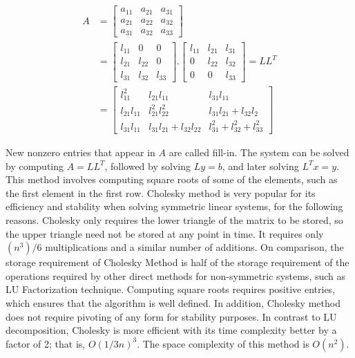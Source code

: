 \begin {align*}
 A &= 
    \begin{bmatrix}
     a_{11}       & a_{21} & a_{31} \\
     a_{21}       & a_{22} & a_{32} \\
     a_{31}       & a_{32} & a_{33} 
    \end{bmatrix} \\
&= 
    \begin{bmatrix}
     l_{11}       & 0 & 0 \\
     l_{21}       & l_{22} & 0 \\
     l_{31}       & l_{32} & l_{33} 
    \end{bmatrix}
       . 
    \begin{bmatrix}
     l_{11}       & l_{21} & l_{31} \\
     0            & l_{22} & l_{32} \\
     0            & 0      & l_{33} 
    \end{bmatrix}    
    = LL^T \\
&= 
    \begin{bmatrix}
     l_{11}^2           & l_{21} l_{11}      & l_{31}l_{11} \\
     l_{21} l_{11}      & l_{21}^2 l_{22}^2  & l_{31}l_{21} + l_{32}l_{2} \\
     l_{31} l_{11}      & l_{31}l_{21} + l_{32}l_{22}      & l_{31}^2 +  l_{32}^2 + l_{33}^2
    \end{bmatrix}
\end {align*}

New nonzero entries that appear in $A$ are called fill-in. The system can be solved by computing $A = LL^T$, followed by solving $Ly=b$, and later solving $L^Tx = y$. This method involves computing square roots of some of the elements, such as the first element in the first row. Cholesky method is very popular for its efficiency and stability when solving symmetric linear systems, for the following reasons. Cholesky only requires the lower triangle of the matrix to be stored, so the upper triangle need not be stored at any point in time. It 
requires only $(n^3)/6$ multiplications and a similar number of additions. On comparison, the storage requirement of Cholesky Method is half of the storage requirement of the operations required by other direct methods for non-symmetric systems, such as LU Factorization technique. Computing square roots requires positive entries, which ensures that the algorithm is well defined. In addition, Cholesky method does not require pivoting of any form for stability purposes. In contrast to LU decomposition, Cholesky is more efficient with its time complexity better by a factor of 2; that is, $O (1/3n)^3.$ The space complexity of this method is $O (n^2)$.\\

